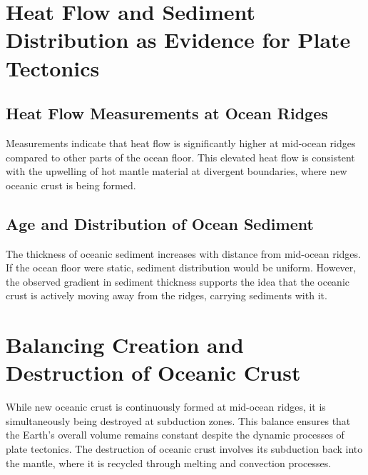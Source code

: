 \documentclass{article}
\begin{document}
\section{Heat Flow and Sediment Distribution as Evidence for Plate Tectonics}

\subsection{Heat Flow Measurements at Ocean Ridges}
Measurements indicate that heat flow is significantly higher at mid-ocean ridges compared to other parts of the ocean floor. This elevated heat flow is consistent with the upwelling of hot mantle material at divergent boundaries, where new oceanic crust is being formed.

\subsection{Age and Distribution of Ocean Sediment}
The thickness of oceanic sediment increases with distance from mid-ocean ridges. If the ocean floor were static, sediment distribution would be uniform. However, the observed gradient in sediment thickness supports the idea that the oceanic crust is actively moving away from the ridges, carrying sediments with it.

\section{Balancing Creation and Destruction of Oceanic Crust}

While new oceanic crust is continuously formed at mid-ocean ridges, it is simultaneously being destroyed at subduction zones. This balance ensures that the Earth's overall volume remains constant despite the dynamic processes of plate tectonics. The destruction of oceanic crust involves its subduction back into the mantle, where it is recycled through melting and convection processes.
\end{document}
